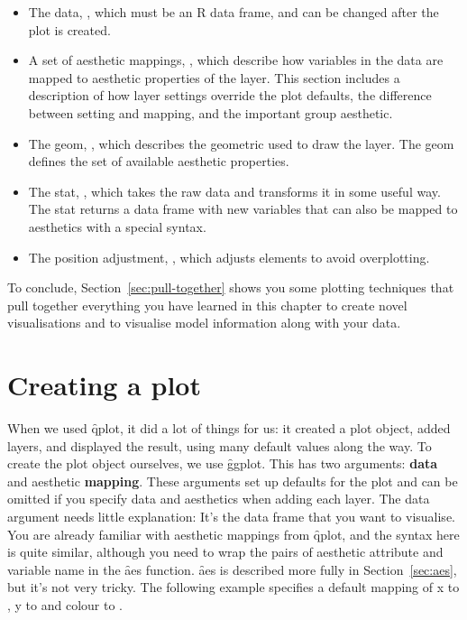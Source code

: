 \begin{itemize}
  \item The data, , which must be an R data frame, and can be changed after the plot is created.

  \item A set of aesthetic mappings, , which describe how variables in the data are mapped to aesthetic properties of the layer.  This section includes a description of how layer settings override the plot defaults, the difference between setting and mapping, and the important group aesthetic.

  \item The geom, , which describes the geometric used to draw the layer.  The geom defines the set of available aesthetic properties.

  \item The stat, , which takes the raw data and transforms it in some useful way.  The stat returns a data frame with new variables that can also be mapped to aesthetics with a special syntax.

  \item The position adjustment, , which adjusts elements to avoid overplotting.
\end{itemize}

To conclude, Section~\ref{sec:pull-together} shows you some plotting techniques that pull together everything you have learned in this chapter to create novel visualisations and to visualise model information along with your data.

\section{Creating a plot}
\label{sec:ggplot}

When we used \f{qplot}, it did a lot of things for us: it created a plot object, added layers, and displayed the result, using many default values along the way. To create the plot object ourselves, we use \f{ggplot}.  This has two arguments: {\bf data} and aesthetic {\bf mapping}. These arguments set up defaults for the plot and can be omitted if you specify data and aesthetics when adding each layer.  The data argument needs little explanation: It's the data frame that you want to visualise.  You are already familiar with aesthetic mappings from \f{qplot}, and the syntax here is quite similar, although you need to wrap the pairs of aesthetic attribute and variable name in the \f{aes} function.  \f{aes} is described more fully in Section~\ref{sec:aes}, but it's not very tricky. The following example specifies a default mapping of x to , y to  and colour to .

